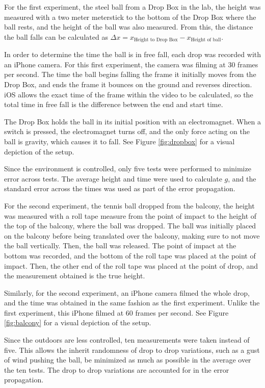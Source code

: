 \documentclass[12pt]{article}
\begin{document}
For the first experiment, the steel ball from a Drop Box in the lab, the height was measured with a two meter meterstick to the bottom of the Drop Box where the ball rests, and the height of the ball was also measured. From this, the distance the ball falls can be calculated as \(\Delta x = x_{\text{Height to Drop Box}} - x_{\text{Height of ball}}\).

In order to determine the time the ball is in free fall, each drop was recorded with an iPhone camera. For this first experiment, the camera was filming at 30 frames per second. The time the ball begins falling the frame it initially moves from the Drop Box, and ends the frame it bounces on the ground and reverses direction. iOS allows the exact time of the frame within the video to be calculated, so the total time in free fall is the difference between the end and start time.

The Drop Box holds the ball in its initial position with an electromagnet. When a switch is pressed, the electromagnet turns off, and the only force acting on the ball is gravity, which causes it to fall. See Figure \ref{fig:dropbox} for a visual depiction of the setup.

Since the environment is controlled, only five tests were performed to minimize error across tests. The average height and time were used to calculate \(g\), and the standard error across the times was used as part of the error propagation.

For the second experiment, the tennis ball dropped from the balcony, the height was measured with a roll tape measure from the point of impact to the height of the top of the balcony, where the ball was dropped. The ball was initially placed on the balcony before being translated over the balcony, making sure to not move the ball vertically. Then, the ball was released. The point of impact at the bottom was recorded, and the bottom of the roll tape was placed at the point of impact. Then, the other end of the roll tape was placed at the point of drop, and the measurement obtained is the true height.

Similarly, for the second experiment, an iPhone camera filmed the whole drop, and the time was obtained in the same fashion as the first experiment. Unlike the first experiment, this iPhone filmed at 60 frames per second. See Figure \ref{fig:balcony} for a visual depiction of the setup.

Since the outdoors are less controlled, ten measurements were taken instead of five. This allows the inherit randomness of drop to drop variations, such as a gust of wind pushing the ball, be minimized as much as possible in the average over the ten tests. The drop to drop variations are accounted for in the error propagation.
\end{document}
